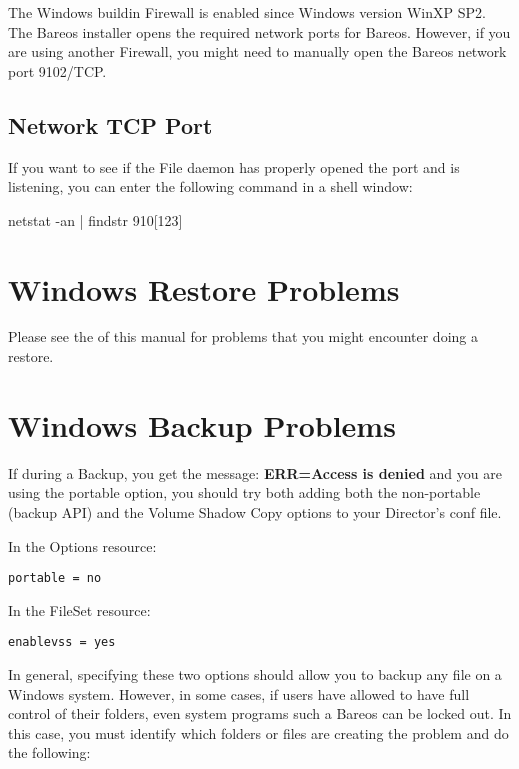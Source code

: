 The Windows buildin Firewall is enabled since Windows version WinXP SP2.
The Bareos installer opens the required network ports for Bareos.
However, if you are using another Firewall, you might need to manually open the Bareos network port 9102/TCP.

\subsection{Network TCP Port}

If you want to see if the File daemon has properly opened the port and is
listening, you can enter the following command in a shell window:

\begin{commands}{}
netstat -an | findstr 910[123]
\end{commands}



\section{Windows Restore Problems}

Please see the
 of this manual for problems
that you might encounter doing a restore.

\section{Windows Backup Problems}

If during a Backup, you get the message:
{\bf ERR=Access is denied} and you are using the portable option,
you should try both adding both the non-portable (backup API) and
the Volume Shadow Copy options to your Director's conf file.

In the Options resource:
\footnotesize
\begin{verbatim}
portable = no
\end{verbatim}
\normalsize

In the FileSet resource:
\footnotesize
\begin{verbatim}
enablevss = yes
\end{verbatim}
\normalsize

In general, specifying these two options should allow you to backup
any file on a Windows system.  However, in some cases, if users
have allowed to have full control of their folders, even system programs
such a Bareos can be locked out.  In this case, you must identify
which folders or files are creating the problem and do the following:

